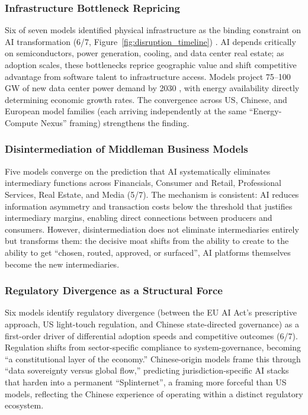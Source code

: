 \documentclass[preprint,review,12pt]{elsarticle}
\begin{document}
\subsubsection{Infrastructure Bottleneck Repricing}
\label{sec:infrastructure_bottleneck}

Six of seven models identified physical infrastructure as the binding constraint on AI transformation (6/7, Figure~\ref{fig:disruption_timeline}) \citep{zeba2021aimanufacturing}. AI depends critically on semiconductors, power generation, cooling, and data center real estate; as adoption scales, these bottlenecks reprice geographic value and shift competitive advantage from software talent to infrastructure access. Models project 75--100 GW of new data center power demand by 2030 \citep{morganstanley2024capex}, with energy availability directly determining economic growth rates. The convergence across US, Chinese, and European model families (each arriving independently at the same ``Energy-Compute Nexus'' framing) strengthens the finding.


\subsubsection{Disintermediation of Middleman Business Models}
\label{sec:disintermediation}

Five models converge on the prediction that AI systematically eliminates intermediary functions across Financials, Consumer and Retail, Professional Services, Real Estate, and Media (5/7). The mechanism is consistent: AI reduces information asymmetry and transaction costs below the threshold that justifies intermediary margins, enabling direct connections between producers and consumers. However, disintermediation does not eliminate intermediaries entirely but transforms them: the decisive moat shifts from the ability to create to the ability to get ``chosen, routed, approved, or surfaced'', AI platforms themselves become the new intermediaries.


\subsubsection{Regulatory Divergence as a Structural Force}
\label{sec:regulatory_divergence}

Six models identify regulatory divergence (between the EU AI Act's prescriptive approach, US light-touch regulation, and Chinese state-directed governance) as a first-order driver of differential adoption speeds and competitive outcomes (6/7). Regulation shifts from sector-specific compliance to system-governance, becoming ``a constitutional layer of the economy.'' Chinese-origin models frame this through ``data sovereignty versus global flow,'' predicting jurisdiction-specific AI stacks that harden into a permanent ``Splinternet'', a framing more forceful than US models, reflecting the Chinese experience of operating within a distinct regulatory ecosystem.
\end{document}
